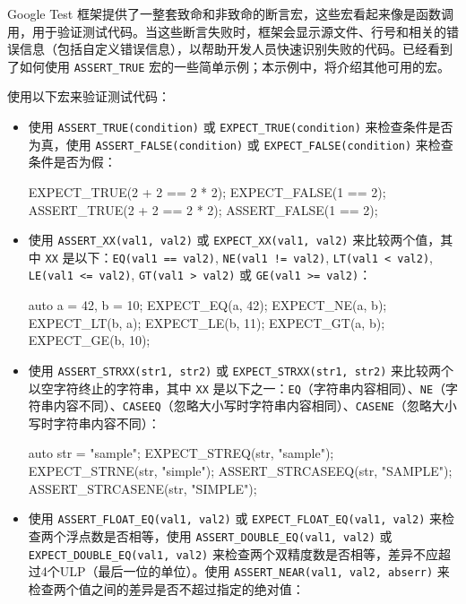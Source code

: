 

Google Test 框架提供了一整套致命和非致命的断言宏，这些宏看起来像是函数调用，用于验证测试代码。当这些断言失败时，框架会显示源文件、行号和相关的错误信息（包括自定义错误信息），以帮助开发人员快速识别失败的代码。已经看到了如何使用 \verb|ASSERT_TRUE| 宏的一些简单示例；本示例中，将介绍其他可用的宏。



使用以下宏来验证测试代码：

\begin{itemize}
\item
使用 \verb|ASSERT_TRUE(condition)| 或 \verb|EXPECT_TRUE(condition)| 来检查条件是否为真，使用 \verb|ASSERT_FALSE(condition)| 或 \verb|EXPECT_FALSE(condition)| 来检查条件是否为假：

\begin{cpp}
EXPECT_TRUE(2 + 2 == 2 * 2);
EXPECT_FALSE(1 == 2);
ASSERT_TRUE(2 + 2 == 2 * 2);
ASSERT_FALSE(1 == 2);
\end{cpp}

\item
使用 \verb|ASSERT_XX(val1, val2)| 或 \verb|EXPECT_XX(val1, val2)| 来比较两个值，其中 \verb|XX| 是以下：\verb|EQ(val1 == val2)|, \verb|NE(val1 != val2)|, \verb|LT(val1 < val2)|, \verb|LE(val1 <= val2)|, \verb|GT(val1 > val2)| 或 \verb|GE(val1 >= val2)|：

\begin{cpp}
auto a = 42, b = 10;
EXPECT_EQ(a, 42);
EXPECT_NE(a, b);
EXPECT_LT(b, a);
EXPECT_LE(b, 11);
EXPECT_GT(a, b);
EXPECT_GE(b, 10);
\end{cpp}

\item
使用 \verb|ASSERT_STRXX(str1, str2)| 或 \verb|EXPECT_STRXX(str1, str2)| 来比较两个以空字符终止的字符串，其中 \verb|XX| 是以下之一：\verb|EQ|（字符串内容相同）、\verb|NE|（字符串内容不同）、\verb|CASEEQ|（忽略大小写时字符串内容相同）、\verb|CASENE|（忽略大小写时字符串内容不同）：

\begin{cpp}
auto str = "sample";
EXPECT_STREQ(str, "sample");
EXPECT_STRNE(str, "simple");
ASSERT_STRCASEEQ(str, "SAMPLE");
ASSERT_STRCASENE(str, "SIMPLE");
\end{cpp}

\item
使用 \verb|ASSERT_FLOAT_EQ(val1, val2)| 或 \verb|EXPECT_FLOAT_EQ(val1, val2)| 来检查两个浮点数是否相等，使用 \verb|ASSERT_DOUBLE_EQ(val1, val2)| 或 \verb|EXPECT_DOUBLE_EQ(val1, val2)| 来检查两个双精度数是否相等，差异不应超过4个ULP（最后一位的单位）。使用 \verb|ASSERT_NEAR(val1, val2, abserr)| 来检查两个值之间的差异是否不超过指定的绝对值：


\end{itemize}
